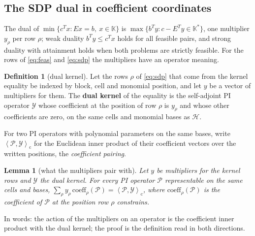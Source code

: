 \documentclass[12pt]{article}
\newcommand{\mcl}[1]{\mathcal{#1}}
\newcommand{\mrm}[1]{\mathrm{#1}}
\newcommand{\ipc}[2]{\left\langle #1,#2\right\rangle_{\mrm{c}}}
\theoremstyle{plain}
\newtheorem{lemma}[theorem]{Lemma}
\theoremstyle{definition}
\newtheorem{definition}[theorem]{Definition}
\theoremstyle{remark}
\begin{document}
\subsection{The SDP dual in coefficient coordinates}\label{sec:sdpdual}

The dual of $\min\{c^Tx:Ex=b,\ x\in\mathbb K\}$ is $\max\{b^Ty:c-E^Ty\in\mathbb K^*\}$, one multiplier $y_\rho$ per row $\rho$; weak duality $b^Ty\le c^Tx$ holds for all feasible pairs, and strong duality with attainment holds when both problems are strictly feasible. For the rows of \eqref{eq:feas} and \eqref{eq:sdp} the multipliers have an operator meaning.

\begin{definition}[dual kernel]\label{def:dualkernel}
Let the rows $\rho$ of \eqref{eq:sdp} that come from the kernel equality be indexed by block, cell and monomial position, and let $y$ be a vector of multipliers for them. The \textbf{dual kernel} of the equality is the self-adjoint PI operator $\mcl Y$ whose coefficient at the position of row $\rho$ is $y_\rho$ and whose other coefficients are zero, on the same cells and monomial bases as $\mcl H$.
\end{definition}

For two PI operators with polynomial parameters on the same bases, write $\ipc{\mcl P}{\mcl Y}$ for the Euclidean inner product of their coefficient vectors over the written positions, the \emph{coefficient pairing}.

\begin{lemma}[what the multipliers pair with]\label{lem:pairing}
Let $y$ be multipliers for the kernel rows and $\mcl Y$ the dual kernel. For every PI operator $\mcl P$ representable on the same cells and bases, $\sum_\rho y_\rho\,\mrm{coeff}_\rho(\mcl P)=\ipc{\mcl P}{\mcl Y}$, where $\mrm{coeff}_\rho(\mcl P)$ is the coefficient of $\mcl P$ at the position row $\rho$ constrains.
\end{lemma}
In words: the action of the multipliers on an operator is the coefficient inner product with the dual kernel; the proof is the definition read in both directions.
\end{document}
